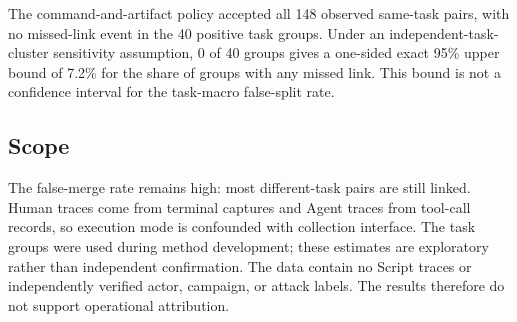 The command-and-artifact policy accepted all 148 observed same-task pairs, with no missed-link event in the 40 positive task groups. Under an independent-task-cluster sensitivity assumption, 0 of 40 groups gives a one-sided exact 95\% upper bound of 7.2\% for the share of groups with any missed link. This bound is not a confidence interval for the task-macro false-split rate.

\subsection{Scope}

The false-merge rate remains high: most different-task pairs are still linked. Human traces come from terminal captures and Agent traces from tool-call records, so execution mode is confounded with collection interface. The task groups were used during method development; these estimates are exploratory rather than independent confirmation. The data contain no Script traces or independently verified actor, campaign, or attack labels. The results therefore do not support operational attribution.
